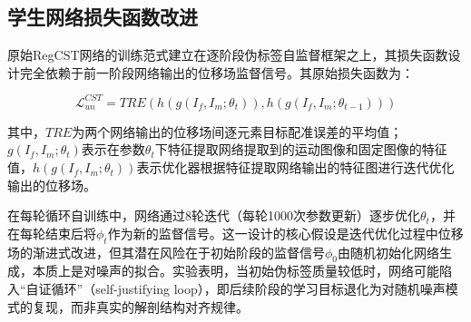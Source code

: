 \begin{algorithm}[h]
    \label{alg:c-cst-2}

\end{algorithm}


\subsection{学生网络损失函数改进}

原始RegCST网络的训练范式建立在逐阶段伪标签自监督框架之上，其损失函数设计完全依赖于前一阶段网络输出的位移场监督信号。其原始损失函数为：

\begin{equation}
    \mathcal{L}_{un}^{CST}=TRE(h(g(I_f,I_m;\theta_t)),h(g(I_f,I_m;\theta_{t-1})))
    \label{eq:3}
\end{equation}

其中，$TRE$为两个网络输出的位移场间逐元素目标配准误差的平均值；$g(I_f,I_m;\theta_t)$表示在参数$\theta_t$下特征提取网络提取到的运动图像和固定图像的特征值，$h(g(I_f,I_m;\theta_t))$表示优化器根据特征提取网络输出的特征图进行迭代优化输出的位移场。

在每轮循环自训练中，网络通过8轮迭代（每轮1000次参数更新）逐步优化$\theta_t$，并在每轮结束后将$\phi_t$作为新的监督信号。这一设计的核心假设是迭代优化过程中位移场的渐进式改进，但其潜在风险在于初始阶段的监督信号$\phi_0$由随机初始化网络生成，本质上是对噪声的拟合。实验表明，当初始伪标签质量较低时，网络可能陷入“自证循环”（self-justifying loop），即后续阶段的学习目标退化为对随机噪声模式的复现，而非真实的解剖结构对齐规律。

